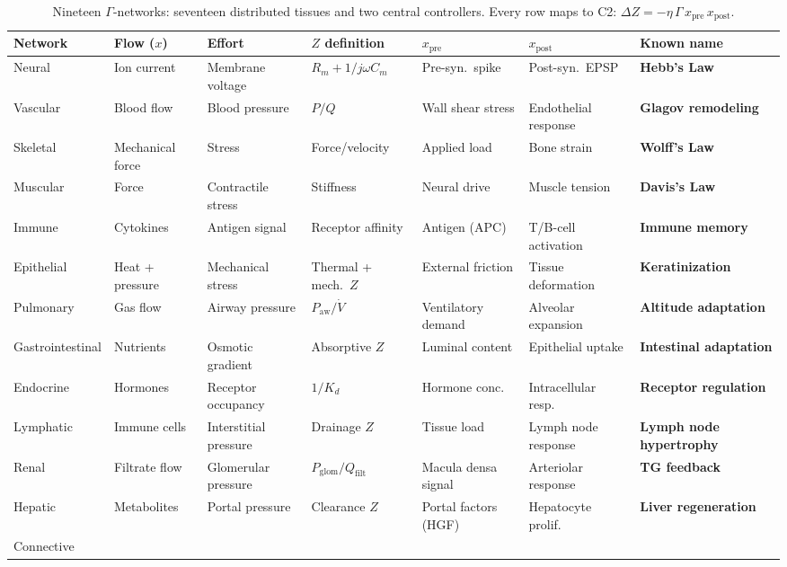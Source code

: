 \documentclass[aps,pre,twocolumn,superscriptaddress,floatfix]{revtex4-2}
\begin{document}
\begin{table}[t]
\centering
\caption{%
Nineteen $\Gamma$-networks: seventeen distributed tissues and two central controllers.
Every row maps to C2: $\Delta Z = -\eta\,\Gamma\,x_{\text{pre}}\,x_{\text{post}}$.
}
\label{tab:nineteen-networks}
\begin{tabular}{lllllll}
\toprule
Network & Flow ($x$) & Effort & $Z$ definition
  & $x_{\text{pre}}$ & $x_{\text{post}}$ & Known name \\
\midrule
Neural
  & Ion current & Membrane voltage & $R_m + 1/j\omega C_m$
  & Pre-syn.\ spike & Post-syn.\ EPSP & \textbf{Hebb's Law} \\
Vascular
  & Blood flow & Blood pressure & $P/Q$
  & Wall shear stress & Endothelial response & \textbf{Glagov remodeling} \\
Skeletal
  & Mechanical force & Stress & Force/velocity
  & Applied load & Bone strain & \textbf{Wolff's Law} \\
Muscular
  & Force & Contractile stress & Stiffness
  & Neural drive & Muscle tension & \textbf{Davis's Law} \\
Immune
  & Cytokines & Antigen signal & Receptor affinity
  & Antigen (APC) & T/B-cell activation & \textbf{Immune memory} \\
Epithelial
  & Heat + pressure & Mechanical stress & Thermal + mech.\ $Z$
  & External friction & Tissue deformation & \textbf{Keratinization} \\
Pulmonary
  & Gas flow & Airway pressure & $P_{\text{aw}}/\dot{V}$
  & Ventilatory demand & Alveolar expansion & \textbf{Altitude adaptation} \\
Gastrointestinal
  & Nutrients & Osmotic gradient & Absorptive $Z$
  & Luminal content & Epithelial uptake & \textbf{Intestinal adaptation} \\
Endocrine
  & Hormones & Receptor occupancy & $1/K_d$
  & Hormone conc.\ & Intracellular resp.\ & \textbf{Receptor regulation} \\
Lymphatic
  & Immune cells & Interstitial pressure & Drainage $Z$
  & Tissue load & Lymph node response & \textbf{Lymph node hypertrophy} \\
Renal
  & Filtrate flow & Glomerular pressure & $P_{\text{glom}}/Q_{\text{filt}}$
  & Macula densa signal & Arteriolar response & \textbf{TG feedback} \\
Hepatic
  & Metabolites & Portal pressure & Clearance $Z$
  & Portal factors (HGF) & Hepatocyte prolif.\ & \textbf{Liver regeneration} \\
Connective

\end{tabular}
\end{table}
\end{document}
